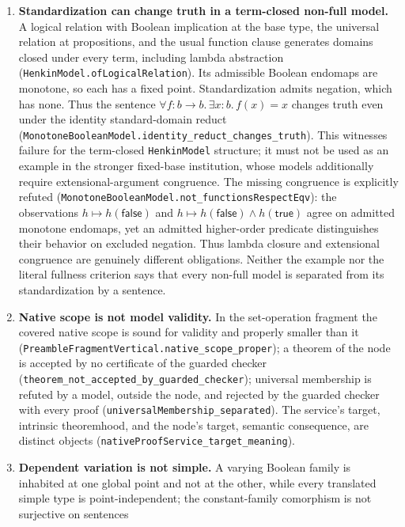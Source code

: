 \documentclass[11pt]{article}
\theoremstyle{definition}
\theoremstyle{remark}
\begin{document}
\begin{enumerate}
  reduct along the sort-collapse arrow
  (\nolinkurl{FullDomainInstitution.BaseCollapse.no_expansion}).
\item \textbf{Standardization can change truth in a term-closed non-full model.}
  A logical relation with Boolean implication at the base type, the universal
  relation at propositions, and the usual function clause generates domains
  closed under every term, including lambda abstraction
  (\nolinkurl{HenkinModel.ofLogicalRelation}). Its admissible Boolean endomaps
  are monotone, so each has a fixed point. Standardization admits negation,
  which has none. Thus the sentence
  $\forall f:b\to b.\,\exists x:b.\,f(x)=x$ changes truth even under the
  identity standard-domain reduct
  (\nolinkurl{MonotoneBooleanModel.identity_reduct_changes_truth}).
  This witnesses failure for the term-closed \texttt{HenkinModel} structure;
  it must not be used as an example in the stronger fixed-base institution,
  whose models additionally require extensional-argument congruence.
  The missing congruence is explicitly refuted
  (\nolinkurl{MonotoneBooleanModel.not_functionsRespectEqv}): the observations
  $h\mapsto h(\mathsf{false})$ and
  $h\mapsto h(\mathsf{false})\wedge h(\mathsf{true})$ agree on admitted monotone
  endomaps, yet an admitted higher-order predicate distinguishes their
  behavior on excluded negation. Thus lambda closure and extensional
  congruence are genuinely different obligations.
  Neither the example nor the literal fullness criterion says that every
  non-full model is separated from its standardization by a sentence.
\item \textbf{Native scope is not model validity.}  In the set-operation
  fragment the covered native scope is sound for validity and properly
  smaller than it (\nolinkurl{PreambleFragmentVertical.native_scope_proper});
  a theorem of the node is accepted by no certificate of the guarded checker
  (\nolinkurl{theorem_not_accepted_by_guarded_checker}); universal
  membership is refuted by a model, outside the node, and rejected by the
  guarded checker with every proof (\nolinkurl{universalMembership_separated}). The
  service's target, intrinsic theoremhood, and the node's target, semantic
  consequence, are distinct objects
  (\nolinkurl{nativeProofService_target_meaning}).
\item \textbf{Dependent variation is not simple.}  A varying Boolean family is
  inhabited at one global point and not at the other, while every translated
  simple type is point-independent; the constant-family comorphism is not
  surjective on sentences

\end{enumerate}
\end{document}
